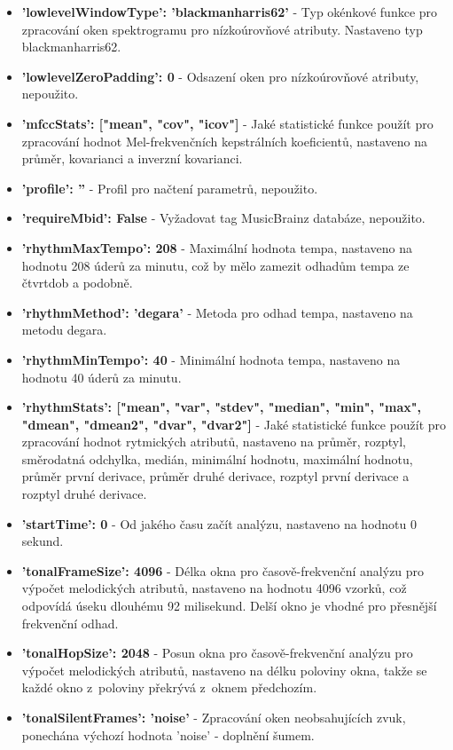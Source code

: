 \begin{itemize}
    \item \textbf{'lowlevelWindowType': 'blackmanharris62'} - Typ okénkové funkce pro zpracování oken spektrogramu pro nízkoúrovňové atributy. Nastaveno typ blackmanharris62.
    \item \textbf{'lowlevelZeroPadding': 0} - Odsazení oken pro nízkoúrovňové atributy, nepoužito.
    \item \textbf{'mfccStats': ["mean", "cov", "icov"]} - Jaké statistické funkce použít pro zpracování hodnot Mel-frekvenčních kepstrálních koeficientů, nastaveno na průměr, kovarianci a inverzní kovarianci.
    \item \textbf{'profile': ''} - Profil pro načtení parametrů, nepoužito.
    \item \textbf{'requireMbid': False} - Vyžadovat tag MusicBrainz databáze, nepoužito.
    \item \textbf{'rhythmMaxTempo': 208} - Maximální hodnota tempa, nastaveno na hodnotu 208 úderů za minutu, což by mělo zamezit odhadům tempa ze čtvrtdob a podobně.
    \item \textbf{'rhythmMethod': 'degara'} - Metoda pro odhad tempa, nastaveno na metodu degara.
    \item \textbf{'rhythmMinTempo': 40} - Minimální hodnota tempa, nastaveno na hodnotu 40 úderů za minutu.
    \item \textbf{'rhythmStats': ["mean", "var", "stdev", "median", "min", "max", "dmean", "dmean2", "dvar", "dvar2"]} - Jaké statistické funkce použít pro zpracování hodnot rytmických atributů, nastaveno na průměr, rozptyl, směrodatná odchylka, medián, minimální hodnotu, maximální hodnotu, průměr první derivace, průměr druhé derivace, rozptyl první derivace a rozptyl druhé derivace.
    \item \textbf{'startTime': 0} - Od jakého času začít analýzu, nastaveno na hodnotu 0 sekund.
    \item \textbf{'tonalFrameSize': 4096} - Délka okna pro časově-frekvenční analýzu pro výpočet melodických atributů, nastaveno na hodnotu 4096 vzorků, což odpovídá úseku dlouhému 92 milisekund. Delší okno je vhodné pro přesnější frekvenční odhad.
    \item \textbf{'tonalHopSize': 2048} - Posun okna pro časově-frekvenční analýzu pro výpočet melodických atributů, nastaveno na délku poloviny okna, takže se každé okno z~poloviny překrývá z~oknem předchozím.
    \item \textbf{'tonalSilentFrames': 'noise'} - Zpracování oken neobsahujících zvuk, ponechána výchozí hodnota 'noise' - doplnění šumem.

\end{itemize}
